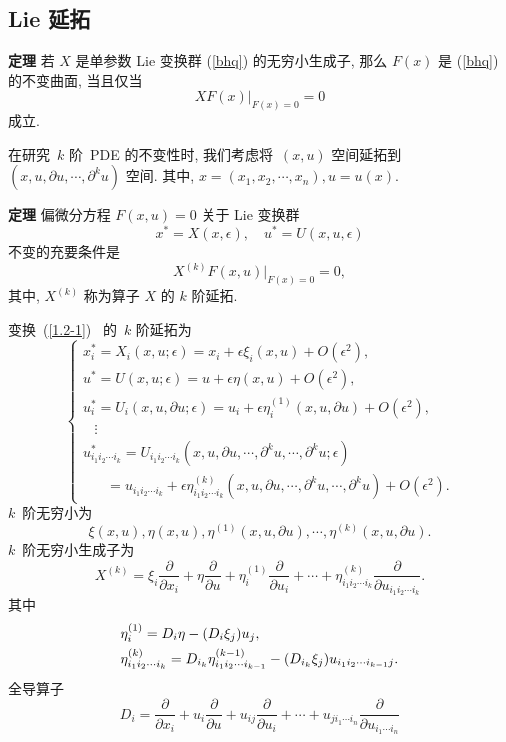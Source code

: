 \subsection{Lie 延拓}
\textbf{定理} 若 $X$ 是单参数 Lie 变换群 (\ref{bhq}) 的无穷小生成子, 那么 $F(x)$ 是 (\ref{bhq}) 的不变曲面, 当且仅当
\begin{equation}
XF(x)|_{F(x)=0}=0
\end{equation}
成立.

在研究~$k$ 阶~PDE 的不变性时, 我们考虑将~$(x,u)$ 空间延拓到~$(x,u,\partial u, \cdots, \partial^k u)$ 空间. 其中, $x=(x_1,x_2,\cdots, x_n), u=u(x)$.

\textbf{定理} 偏微分方程 $F(x,u)=0$ 关于 Lie 变换群
\begin{equation}
x^*=X(x,\epsilon),\quad u^*=U(x,u,\epsilon)
\end{equation}
不变的充要条件是
\begin{equation}
X^{(k)}F(x,u)|_{F(x)=0}=0,
\end{equation}
其中, $X^{(k)}$ 称为算子 $X$ 的 $k$ 阶延拓.


变换~(\ref{1.2-1})~ 的~$k$ 阶延拓为
\begin{equation}\label{1.2-3}
\begin{cases}
x_i^*=X_i(x,u;\epsilon)=x_i+\epsilon\xi_i(x,u)+O(\epsilon^2),\\
u^*=U(x,u;\epsilon)=u+\epsilon\eta(x,u)+O(\epsilon^2),\\
u_i^*=U_i(x,u,\partial u;\epsilon)=u_i+\epsilon\eta^{(1)}_i(x,u,\partial u)+O(\epsilon^2),\\
\;\;\;\vdots\\
u^*_{i_1i_2\cdots i_k}=U_{i_1i_2\cdots i_k}(x,u,\partial u,\cdots,\partial^k u,\cdots,\partial^k u;\epsilon)\\
\;\;\;\;\;\;=u_{i_1i_2\cdots i_k}+\epsilon\eta^{(k)}_{i_1i_2\cdots i_k}(x,u,\partial u,\cdots,\partial^k u,\cdots,\partial^k u)+O(\epsilon^2).
\end{cases}
\end{equation}
$k$~阶无穷小为
\begin{equation}\label{1.2-4}
\xi(x,u),\eta(x,u),\eta^{(1)}(x,u,\partial u),\cdots,\eta^{(k)}(x,u,\partial u).
\end{equation}
$k$~阶无穷小生成子为
\begin{equation}\label{1.2-5}
X^{(k)}=\xi_i\frac{\partial}{\partial x_i}+\eta\frac{\partial}{\partial u}+\eta^{(1)}_i\frac{\partial}{\partial u_i}+\cdots+\eta^{(k)}_{i_1i_2\cdots i_k}\frac{\partial}{\partial u_{i_1i_2\cdots i_k}}.
\end{equation}
其中
\begin{align}\label{1.2-6}
&\eta^{(1)}_i=D_i\eta-(D_i\xi_j)u_j,\notag\\
&\eta^{(k)}_{i_1i_2\cdots i_k}=D_{i_k}\eta^{(k-1)}_{i_1i_2\cdots i_{k-1}}-(D_{i_k}\xi_j)u_{i_1i_2\cdots i_{k-1}j}.
\end{align}
全导算子
\begin{equation}\label{qd-Operator}
D_i=\frac{\partial}{\partial x_i}+u_i\frac{\partial}{\partial u}+u_{ij}\frac{\partial}{\partial u_i}+\cdots+u_{ji_1\cdots i_n}\frac{\partial}{\partial u_{i_1\cdots i_n}}
\end{equation}
